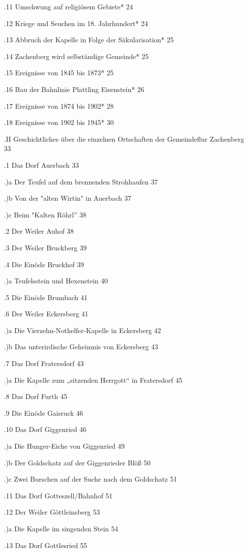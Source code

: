 .11 Umschwung auf religiösem Gebiete*   24

.12 Kriege und Seuchen im 18. Jahrhundert*  24

.13 Abbruch der Kapelle in Folge der Säkularisation*    25

.14 Zachenberg wird selbständige Gemeinde*  25

.15 Ereignisse von 1845 bis 1873*   25

.16 Bau der Bahnlinie Plattling Eisenstein* 26

.17 Ereignisse von 1874 bis 1902*   28

.18 Ereignisse von 1902 bis 1945*   30

.II Geschichtliches über die einzelnen Ortschaften der Gemeindeflur Zachenberg 
33

.1 Das Dorf Auerbach    33

.)a Der Teufel auf dem brennenden Strohhaufen   37

.)b Von der "alten Wirtin" in Auerbach  37

.)c Beim "Kalten Röhrl” 38

.2 Der Weiler Auhof 38

.3 Der Weiler Bruckberg 39

.4 Die Einöde Bruckhof  39

.)a Teufelsstein und Hexenstein 40

.5 Die Einöde Brumbach  41

.6 Der Weiler Eckersberg    41

.)a Die Vierzehn-Nothelfer-Kapelle in Eckersberg    42

.)b Das unterirdische Geheimnis von Eckersberg  43

.7 Das Dorf Fratersdorf 43

.)a Die Kapelle zum „sitzenden Herrgott“ in Fratersdorf 45

.8 Das Dorf Furth   45

.9 Die Einöde Gaisruck  46

.10 Das Dorf Giggenried 46

.)a Die Hunger-Eiche von Giggenried 49

.)b Der Goldschatz auf der Giggenrieder Blöß    50

.)c Zwei Burschen auf der Suche nach dem Goldschatz 51

.11 Das Dorf Gotteszell/Bahnhof 51

.12 Der Weiler Göttleinsberg    53

.)a Die Kapelle im singenden Stein  54

.13 Das Dorf Gottlesried    55

